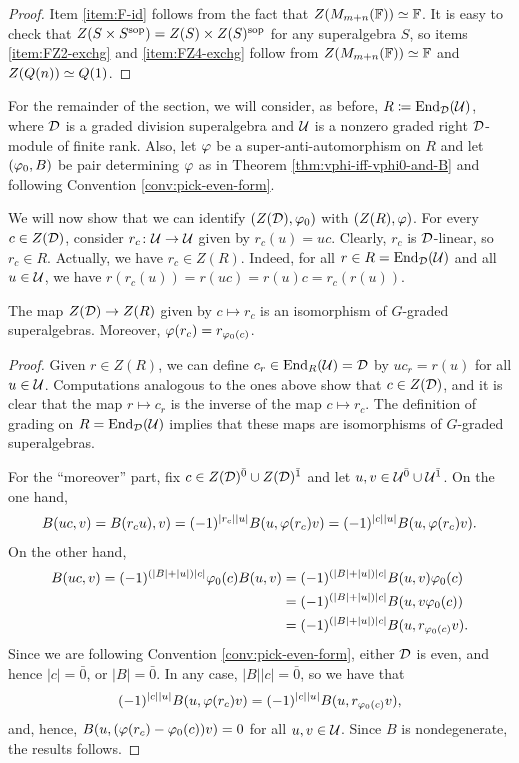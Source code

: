 \begin{proof}
    Item \eqref{item:F-id} follows from the fact that $Z(M_{m+n}(\mathbb{F})) \simeq \mathbb{F}$. 
    It is easy to check that $Z(S\times S^{\mathrm{sop}}) = Z(S) \times Z(S)^{\mathrm{sop}}$ for any superalgebra $S$, so items \eqref{item:FZ2-exchg} and \eqref{item:FZ4-exchg} follow from $Z(M_{m+n}(\mathbb{F})) \simeq \mathbb{F}$ and $Z(Q(n)) \simeq Q(1)$.
\end{proof}

For the remainder of the section, we will consider, as before, $R \coloneqq \operatorname{End}_{\mathcal{D}}(\mathcal U)$, where $\mathcal{D}$ is a graded division superalgebra and $\mathcal U$ is a nonzero graded right $\mathcal{D}$-module of finite rank. 
Also, let $\varphi$ be a super-anti-automorphism on $R$ and let $(\varphi_0, B)$ be pair determining $\varphi$ as in Theorem \ref{thm:vphi-iff-vphi0-and-B} and following Convention \ref{conv:pick-even-form}.

We will now show that we can identify $(Z(\mathcal{D}), \varphi_0)$ with $(Z(R), \varphi)$. 
For every $c\in Z(\mathcal{D})$, consider $r_c\colon \mathcal U \to \mathcal U$ given by $r_c(u) = uc$. 
Clearly, $r_c$ is $\mathcal{D}$-linear, so $r_c \in R$. 
Actually, we have $r_c\in Z(R)$. 
Indeed, for all $r\in R = \operatorname{End}_{\mathcal{D}}(\mathcal U)$ and all $u\in \mathcal U$, we have $r (r_c(u)) = r(uc) = r(u) c = r_c(r(u))$.

\begin{prop}\label{prop:R-and-D-have-the-same-center}
    The map $Z(\mathcal{D}) \to Z(R)$ given by $c \mapsto r_c$ is an isomorphism of $G$-graded superalgebras. 
    Moreover, $\varphi (r_c) = r_{\varphi_0(c)}$.
\end{prop}

\begin{proof}
    Given $r\in Z(R)$, we can define $c_r\in \operatorname{End}_R (\mathcal U) =\mathcal{D}$ by $uc_r = r(u)$ for all $u\in \mathcal U$. 
    Computations analogous to the ones above show that $c\in Z(\mathcal{D})$, and it is clear that the map $r\mapsto c_r$ is the inverse of the map $c \mapsto r_c$. 
    The definition of grading on $R = \operatorname{End}_{\mathcal{D}} (\mathcal U)$ implies that these maps are isomorphisms of $G$-graded superalgebras.
    
    For the ``moreover'' part, fix $c\in Z(\mathcal{D})^{\bar0} \cup Z(\mathcal{D})^{\bar1}$ and let $u, v \in \mathcal U^{\bar0} \cup \mathcal U^{\bar1}$. 
    On the one hand, 
    \begin{align*}
        B(uc,v) = B(r_c u), v) = (-1)^{|r_c||u|} B(u, \varphi(r_c) v) = (-1)^{|c||u|} B(u, \varphi(r_c) v).
    \end{align*}
    On the other hand,
    \begin{align*}
        B(uc, v) = (-1)^{(|B| + |u|) |c|} \varphi_0(c) B(u, v)  &= (-1)^{(|B| + |u|) |c|} B(u, v) \varphi_0(c)\\
        &= (-1)^{(|B| + |u|) |c|} B(u, v \varphi_0(c) )\\
        &= (-1)^{(|B| + |u|) |c|} B(u, r_{\varphi_0(c)}v).
    \end{align*}
    Since we are following Convention \ref{conv:pick-even-form}, either $\mathcal{D}$ is even, and hence $|c| = \bar 0$, or
    $|B| = \bar 0$. 
    In any case, $|B||c| = \bar 0$, so we have that \[(-1)^{|c||u|} B(u, \varphi(r_c) v) = (-1)^{|c||u|} B(u, r_{\varphi_0(c)}v),\] and, hence, $B(u, (\varphi(r_c) - \varphi_0(c)) v) = 0$ for all $u, v \in \mathcal U$. 
    Since $B$ is nondegenerate, the results follows.
\end{proof}

